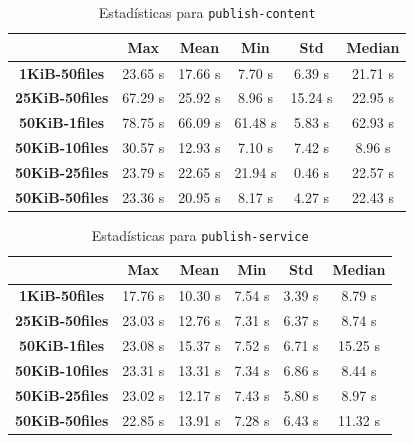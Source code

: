 \setlength\tabcolsep{10pt}
\begin{table}[!htbp]
    \centering
    \begin{tabular}{|c|c|c|c|c|c|}
    \hline
    & \textbf{Max} & \textbf{Mean} & \textbf{Min} & \textbf{Std} & \textbf{Median} \\
    \hline
    \textbf{1KiB-50files} & 23.65 s & 17.66 s & 7.70 s & 6.39 s & 21.71 s \\
    \hline
    \textbf{25KiB-50files} & 67.29 s & 25.92 s & 8.96 s & 15.24 s & 22.95 s \\
    \hline
    \textbf{50KiB-1files} & 78.75 s & 66.09 s & 61.48 s & 5.83 s & 62.93 s \\
    \hline
    \textbf{50KiB-10files} & 30.57 s & 12.93 s & 7.10 s & 7.42 s & 8.96 s \\
    \hline
    \textbf{50KiB-25files} & 23.79 s & 22.65 s & 21.94 s & 0.46 s & 22.57 s \\
    \hline
    \textbf{50KiB-50files} & 23.36 s & 20.95 s & 8.17 s & 4.27 s & 22.43 s \\
    \hline
    \end{tabular}
    \caption{Estadísticas para \texttt{publish-content}}
\end{table}

\setlength\tabcolsep{10pt}
\begin{table}[!htbp]
    \centering
    \begin{tabular}{|c|c|c|c|c|c|}
    \hline
    & \textbf{Max} & \textbf{Mean} & \textbf{Min} & \textbf{Std} & \textbf{Median} \\
    \hline
    \textbf{1KiB-50files} & 17.76 s & 10.30 s & 7.54 s & 3.39 s & 8.79 s \\
    \hline
    \textbf{25KiB-50files} & 23.03 s & 12.76 s & 7.31 s & 6.37 s & 8.74 s \\
    \hline
    \textbf{50KiB-1files} & 23.08 s & 15.37 s & 7.52 s & 6.71 s & 15.25 s \\
    \hline
    \textbf{50KiB-10files} & 23.31 s & 13.31 s & 7.34 s & 6.86 s & 8.44 s \\
    \hline
    \textbf{50KiB-25files} & 23.02 s & 12.17 s & 7.43 s & 5.80 s & 8.97 s \\
    \hline
    \textbf{50KiB-50files} & 22.85 s & 13.91 s & 7.28 s & 6.43 s & 11.32 s \\
    \hline
    \end{tabular}
    \caption{Estadísticas para \texttt{publish-service}}
\end{table}

